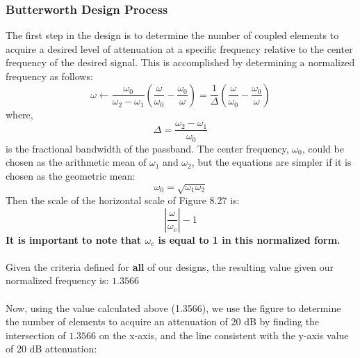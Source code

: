 \documentclass{article}
\begin{document}
\subsubsection{Butterworth Design Process}
The first step in the design is to determine the number of coupled elements to acquire a desired level of attenuation at a specific frequency relative to the center frequency of the desired signal. This is accomplished by determining a normalized frequency as follows:
\begin{equation}
    \omega \leftarrow \dfrac{\omega_0}{\omega_2 - \omega_1} \left( \dfrac{\omega}{\omega_0} - \dfrac{\omega_0}{\omega} \right) = \dfrac{1}{\Delta} \left( \dfrac{\omega}{\omega_0} - \dfrac{\omega_0}{\omega} \right)
\end{equation}
where,\\
\begin{equation}
    \Delta = \dfrac{\omega_2 - \omega_1}{\omega_0}
\end{equation}
is the fractional bandwidth of the passband. The center frequency, $\omega_0$, could be chosen as the arithmetic mean of $\omega_1$ and $\omega_2$, but the equations are simpler if it is chosen as the geometric mean:
\begin{equation}
    \omega_0 = \sqrt{\omega_1 \omega_2}
\end{equation}
Then the scale of the horizontal scale of Figure 8.27 is:
\begin{equation}
    \left| \dfrac{\omega}{\omega_c} \right| - 1
\end{equation}
\textbf{It is important to note that $\omega_c$ is equal to 1 in this normalized form.}\cite{Pozar}\\
\textbf{ }\\
Given the criteria defined for \textbf{all} of our designs, the resulting value given our normalized frequency is: $1.3566$\\
\text{ }\\
Now, using the value calculated above (1.3566), we use the figure to determine the number of elements to acquire an attenuation of 20 dB by finding the intersection of $1.3566$ on the x-axis, and the line consistent with the y-axis value of 20 dB attenuation:
\end{document}
